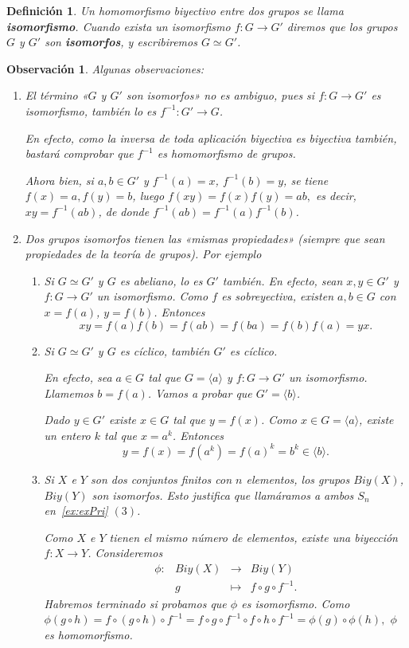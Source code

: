 \documentclass[12pt]{article}
\newtheorem{definition}[theorem]{Definición}
\newtheorem{observation}{Observación}[theorem]
\begin{document}
\begin{definition}Un homomorfismo biyectivo entre dos grupos se llama \textbf{isomorfismo}. Cuando exista un isomorfismo $f \colon G \longrightarrow G'$ diremos que los grupos $G$ y $G'$ son \textbf{isomorfos}, y escribiremos $G \simeq G'$.
\end{definition}

\begin{observation}Algunas observaciones:
\begin{enumerate}
\item El término «$G$ y $G'$ son isomorfos» no es ambiguo, pues si $f \colon G \longrightarrow G'$ es isomorfismo, también lo es $f^{-1}\colon G' \longrightarrow G$. 

En efecto, como la inversa de toda aplicación biyectiva es biyectiva también, bastará comprobar que $f^{-1}$ es homomorfismo de grupos.

Ahora bien, si $a,b \in G'$ y $f^{-1}(a) = x$, $f^{-1}(b) = y$, se tiene $f(x) = a, f(y) = b$, luego $f(xy) = f(x) f(y) = ab,$ es decir, $xy = f^{-1}(ab)$, de donde $f^{-1}(ab) = f^{-1}(a)f^{-1}(b)$.
\item Dos grupos isomorfos tienen las «mismas propiedades» (siempre que sean propiedades de la teoría de grupos). Por ejemplo 
\begin{enumerate}
\item Si $G \simeq G'$ y $G$ es abeliano, lo es $G'$ también. En efecto, sean $x,y \in G'$ y $f \colon G \longrightarrow G'$ un isomorfismo. Como $f$ es sobreyectiva, existen $a,b \in G$ con $x = f(a)$, $y = f(b)$. Entonces $$xy = f(a)f(b) = f(ab) = f(ba) = f(b)f(a) = yx.$$
\item Si $G \simeq G'$ y $G$ es cíclico, también $G'$ es cíclico. 

En efecto, sea $a \in G$ tal que $G = \langle a \rangle$ y $f \colon G\longrightarrow G'$ un isomorfismo. Llamemos $b= f(a)$. Vamos a probar que $G' = \langle b \rangle$. 

Dado $y \in G'$ existe $x \in G$ tal que $y = f(x)$. Como $x \in G = \langle a \rangle$, existe un entero $k$ tal que $x = a^k$. Entonces $$y=f(x) = f(a^k) = f(a)^k = b^k \in \langle b \rangle.$$
\item Si $X$ e $Y$ son dos conjuntos finitos con $n$ elementos, los grupos $Biy(X)$, $Biy(Y)$ son isomorfos. Esto justifica que llamáramos a ambos $S_n$ en~\ref{ex:exPri} $(3)$.

Como $X$ e $Y$ tienen el mismo número de elementos, existe una biyección $f \colon X \longrightarrow Y$. Consideremos  $$\begin{array}{rccl}
\phi\colon &Biy(X)& \longrightarrow &Biy(Y)\\
&g& \longmapsto &f \circ g \circ f^{-1}.
\end{array}
$$ Habremos terminado si probamos que $\phi$ es isomorfismo. Como $\phi(g \circ h) = f \circ (g \circ h) \circ f^{-1} = f \circ g \circ f^{-1} \circ f \circ h \circ f^{-1} = \phi(g) \circ \phi(h),$ $\phi$ es homomorfismo. 


\end{enumerate}
\end{enumerate}
\end{observation}
\end{document}
